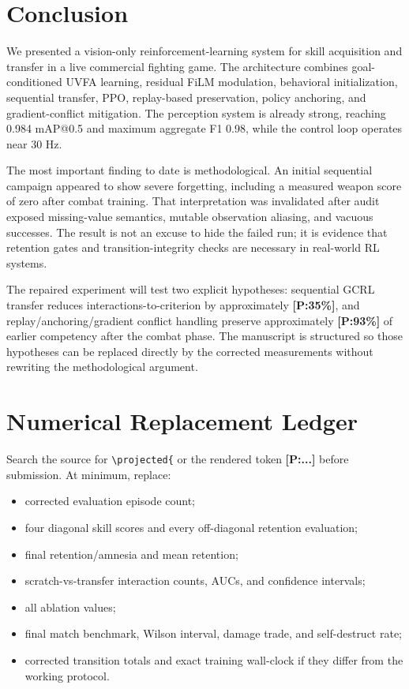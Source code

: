 \documentclass[11pt]{article}
\newcommand{\projected}[1]{\textcolor{Projection}{\textbf{[P:#1]}}}
\begin{document}
\section{Conclusion}
We presented a vision-only reinforcement-learning system for skill acquisition and transfer in a live commercial fighting game. The architecture combines goal-conditioned UVFA learning, residual FiLM modulation, behavioral initialization, sequential transfer, PPO, replay-based preservation, policy anchoring, and gradient-conflict mitigation. The perception system is already strong, reaching 0.984 mAP@0.5 and maximum aggregate F1 0.98, while the control loop operates near 30 Hz.

The most important finding to date is methodological. An initial sequential campaign appeared to show severe forgetting, including a measured weapon score of zero after combat training. That interpretation was invalidated after audit exposed missing-value semantics, mutable observation aliasing, and vacuous successes. The result is not an excuse to hide the failed run; it is evidence that retention gates and transition-integrity checks are necessary in real-world RL systems.

The repaired experiment will test two explicit hypotheses: sequential GCRL transfer reduces interactions-to-criterion by approximately \projected{35\%}, and replay/anchoring/gradient conflict handling preserve approximately \projected{93\%} of earlier competency after the combat phase. The manuscript is structured so those hypotheses can be replaced directly by the corrected measurements without rewriting the methodological argument.

\appendix
\section{Numerical Replacement Ledger}
Search the source for \texttt{\textbackslash projected\{} or the rendered token \textbf{[P:...]} before submission. At minimum, replace:
\begin{itemize}[leftmargin=1.4em]
  \item corrected evaluation episode count;
  \item four diagonal skill scores and every off-diagonal retention evaluation;
  \item final retention/amnesia and mean retention;
  \item scratch-vs-transfer interaction counts, AUCs, and confidence intervals;
  \item all ablation values;
  \item final match benchmark, Wilson interval, damage trade, and self-destruct rate;
  \item corrected transition totals and exact training wall-clock if they differ from the working protocol.
\end{itemize}
\end{document}
